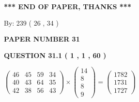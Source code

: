 \documentclass[12pt]{article}
\begin{document}
   
   
   
   
\vspace{1.0in} 
{\textbf{\large{ *** END OF PAPER, THANKS *** }}} 
   
   
\hspace{1.0in} By: 
         239 (          26 ,           34 )
   
   
   
   
\newpage 
\setcounter{page}{ 
    31001 } 
   
   
 {\textbf{ \Large{ PAPER NUMBER           31  }}}
   
   
   
   
  
  
{\textbf{\large{QUESTION
31.1 
 (           1 ,           1 ,          60 )
}}}

 
$\left( \begin{array}{ccccccccccccccc}
          46  & 
          45  & 
          59  & 
          34  \\ 
          40  & 
          43  & 
          64  & 
          35  \\ 
          42  & 
          38  & 
          56  & 
          43
\end{array}\right) \times
\left( \begin{array}{c}
          14  \\ 
           8  \\ 
           8  \\ 
           9
\end{array}\right)  =
\left( \begin{array}{c}
        1782  \\ 
        1731  \\ 
        1727
\end{array}\right)  $
 
\end{document}
